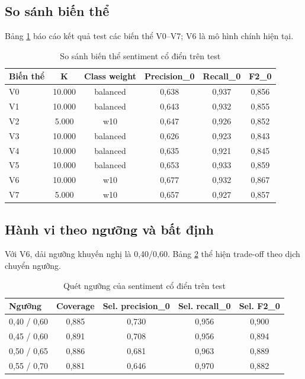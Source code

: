 ﻿\documentclass[12pt,a4paper]{article}
\begin{document}
\subsection{So sánh biến thể}
Bảng \ref{tab:classic_variants_vi} báo cáo kết quả test các biến thể V0--V7; V6 là mô hình chính hiện tại.

\begin{table}[H]
\centering
\caption{So sánh biến thể sentiment cổ điển trên test}
\label{tab:classic_variants_vi}
\begin{tabular}{lccccc}
\toprule
Biến thể & K & Class weight & Precision\_0 & Recall\_0 & F2\_0 \\
\midrule
V0 & 10.000 & balanced & 0,638 & 0,937 & 0,856 \\
V1 & 10.000 & balanced & 0,643 & 0,932 & 0,855 \\
V2 & 5.000 & w10 & 0,647 & 0,926 & 0,852 \\
V3 & 10.000 & balanced & 0,626 & 0,923 & 0,843 \\
V4 & 10.000 & balanced & 0,635 & 0,921 & 0,845 \\
V5 & 10.000 & balanced & 0,653 & 0,933 & 0,859 \\
V6 & 10.000 & w10 & 0,677 & 0,932 & 0,867 \\
V7 & 5.000 & w10 & 0,657 & 0,927 & 0,857 \\
\bottomrule
\end{tabular}
\end{table}

\subsection{Hành vi theo ngưỡng và bất định}
Với V6, dải ngưỡng khuyến nghị là 0,40/0,60. Bảng \ref{tab:classic_threshold_vi} thể hiện trade-off theo dịch chuyển ngưỡng.

\begin{table}[H]
\centering
\caption{Quét ngưỡng của sentiment cổ điển trên test}
\label{tab:classic_threshold_vi}
\begin{tabular}{lcccc}
\toprule
Ngưỡng & Coverage & Sel. precision\_0 & Sel. recall\_0 & Sel. F2\_0 \\
\midrule
0,40 / 0,60 & 0,885 & 0,730 & 0,956 & 0,900 \\
0,45 / 0,60 & 0,891 & 0,708 & 0,956 & 0,894 \\
0,50 / 0,65 & 0,886 & 0,681 & 0,963 & 0,889 \\
0,55 / 0,70 & 0,881 & 0,646 & 0,970 & 0,882 \\
\bottomrule
\end{tabular}
\end{table}
\end{document}

